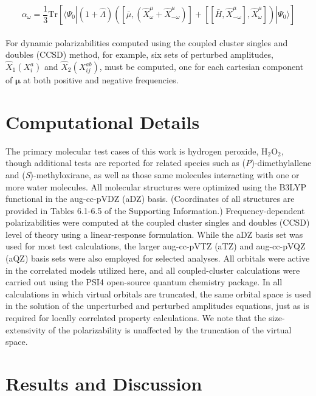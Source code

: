 \begin{equation}
\alpha_{\omega} = \frac{1}{3} \mathrm{Tr}\left[
\langle\Psi_0|(1+\hat{\Lambda})\left(
\left[\bar{\mu},(\hat{X}^{{\mu}}_{\omega} +
\hat{X}^{{\mu}}_{-\omega})\right] +
\left[\left[\bar{H},\hat{X}^{{\mu}}_{-\omega}\right],
\hat{X}^{{\mu}}_{\omega}\right]\right) | \Psi_0\rangle\right]
\label{Eq:alpha}
\end{equation}
\\
For dynamic polarizabilities computed using the coupled cluster singles and
doubles (CCSD) method, for example, six sets of perturbed amplitudes,
$\hat{X}_1 (X^{a}_{i})$ and $\hat{X}_2 (X^{ab}_{ij})$, must be computed, one for each cartesian
component of $\bm{\mu}$ at both positive and negative frequencies.

\section{Computational Details}

The primary molecular test cases of this work is hydrogen peroxide,
H$_2$O$_2$, though additional tests are reported for related species such as
(\textit{P})-dimethylallene and (\textit{S})-methyloxirane, as well as those
same molecules interacting with one or more water molecules.  All molecular
structures were optimized using the B3LYP
functional\cite{Becke93,Lee88:LYP,Stephens94:B3LYP} in the aug-cc-pVDZ (aDZ)
basis\cite{Dunning89,Kendall92,Woon94}. (Coordinates of all structures are
provided in Tables 6.1-6.5 of the Supporting Information.) Frequency-dependent
polarizabilities were computed at the coupled cluster singles and doubles
(CCSD) level of theory\cite{Purvis82} using a linear-response
formulation\cite{Christiansen98}. While the aDZ basis set was used for most
test calculations, the larger aug-cc-pVTZ (aTZ) and aug-cc-pVQZ (aQZ) basis
sets were also employed for selected analyses\cite{Kendall92}. All orbitals
were active in the correlated models utilized here, and all coupled-cluster
calculations were carried out using the PSI4 open-source quantum chemistry
package\cite{psi4}.  In all calculations in which virtual orbitals are
truncated, the same orbital space is used in the solution of the unperturbed
and perturbed amplitudes equations, just as is required for locally correlated
property calculations\cite{Crawford10}.  We note that the size-extensivity of
the polarizability is unaffected by the truncation of
the virtual space.

\section{Results and Discussion}

